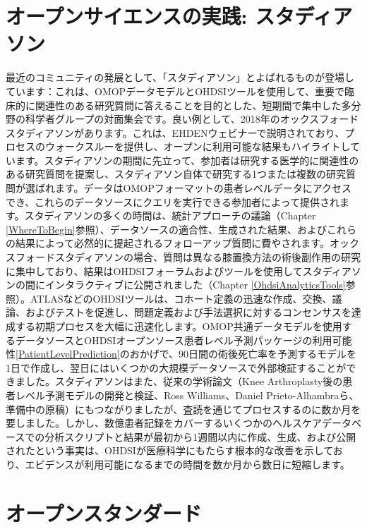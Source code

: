 \documentclass[
  11pt]{book}
\theoremstyle{definition}
\theoremstyle{definition}
\theoremstyle{definition}
\theoremstyle{definition}
\theoremstyle{remark}
\begin{document}
\section{オープンサイエンスの実践: スタディアソン}\label{ux30aaux30fcux30d7ux30f3ux30b5ux30a4ux30a8ux30f3ux30b9ux306eux5b9fux8df5-ux30b9ux30bfux30c7ux30a3ux30a2ux30bdux30f3}


最近のコミュニティの発展として、「スタディアソン」とよばれるものが登場しています：これは、OMOPデータモデルとOHDSIツールを使用して、重要で臨床的に関連性のある研究質問に答えることを目的とした、短期間で集中した多分野の科学者グループの対面集会です。良い例として、2018年のオックスフォードスタディアソンがあります。これは、EHDENウェビナーで説明されており、プロセスのウォークスルーを提供し、オープンに利用可能な結果もハイライトしています。スタディアソンの期間に先立って、参加者は研究する医学的に関連性のある研究質問を提案し、スタディアソン自体で研究する1つまたは複数の研究質問が選ばれます。データはOMOPフォーマットの患者レベルデータにアクセスでき、これらのデータソースにクエリを実行できる参加者によって提供されます。スタディアソンの多くの時間は、統計アプローチの議論（Chapter \ref{WhereToBegin}参照）、データソースの適合性、生成された結果、およびこれらの結果によって必然的に提起されるフォローアップ質問に費やされます。オックスフォードスタディアソンの場合、質問は異なる膝置換方法の術後副作用の研究に集中しており、結果はOHDSIフォーラムおよびツールを使用してスタディアソンの間にインタラクティブに公開されました（Chapter \ref{OhdsiAnalyticsTools}参照）。ATLASなどのOHDSIツールは、コホート定義の迅速な作成、交換、議論、およびテストを促進し、問題定義および手法選択に対するコンセンサスを達成する初期プロセスを大幅に迅速化します。OMOP共通データモデルを使用するデータソースとOHDSIオープンソース患者レベル予測パッケージの利用可能性\ref{PatientLevelPrediction}のおかげで、90日間の術後死亡率を予測するモデルを1日で作成し、翌日にはいくつかの大規模データソースで外部検証することができました。スタディアソンはまた、従来の学術論文（Knee Arthroplasty後の患者レベル予測モデルの開発と検証、Ross Williams、Daniel Prieto-Alhambraら、準備中の原稿）にもつながりましたが、査読を通じてプロセスするのに数か月を要しました。しかし、数億患者記録をカバーするいくつかのヘルスケアデータベースでの分析スクリプトと結果が最初から1週間以内に作成、生成、および公開されたという事実は、OHDSIが医療科学にもたらす根本的な改善を示しており、エビデンスが利用可能になるまでの時間を数か月から数日に短縮します。

\section{オープンスタンダード}\label{ux30aaux30fcux30d7ux30f3ux30b9ux30bfux30f3ux30c0ux30fcux30c9}
\end{document}
